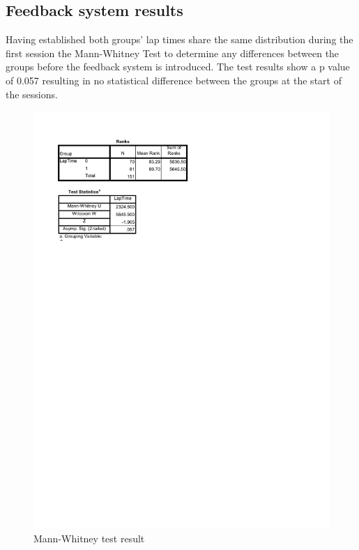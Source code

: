 \subsection{Feedback system results}

Having established both groups' lap times share the same distribution during the first session the Mann-Whitney Test to determine any differences between the groups before the feedback system is introduced. The test results show a p value of 0.057 resulting in no statistical difference between the groups at the start of the sessions.

\begin{figure}[!htb]
	\centering
	\includegraphics[width=\textwidth]{charts/Mann-Whitney.pdf}
	\caption[Mann-Whitney]{Mann-Whitney test result}
	\label{fig:chart-KolmogorowSmimov}
\end{figure}

